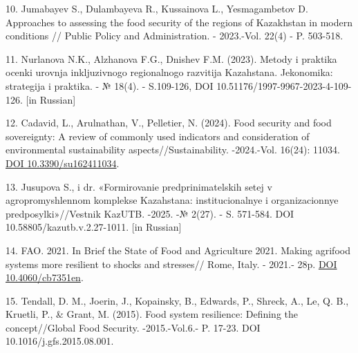 \begin{refs}
10. Jumabayev S., Dulambayeva R., Kussainova L., Yesmagambetov D.
Approaches to assessing the food security of the regions of Kazakhstan
in modern conditions // Public Policy and Administration. - 2023.-Vol.
22(4) - P. 503-518.

11. Nurlanova N.K., Al\textquotesingle zhanova F.G., Dnishev F.M.
(2023). Metody i praktika ocenki urovnja inkljuzivnogo
regional\textquotesingle nogo razvitija Kazahstana. Jekonomika:
strategija i praktika. - № 18(4). - S.109-126, DOI
10.51176/1997-9967-2023-4-109-126. {[}in Russian{]}

12. Cadavid, L., Arulnathan, V., Pelletier, N. (2024). Food security and
food sovereignty: A review of commonly used indicators and consideration
of environmental sustainability aspects//Sustainability. -2024.-Vol.
16(24): 11034. \href{https://doi.org/10.3390/su162411034}{DOI
10.3390/su162411034}.

13. Jusupova S., i dr. «Formirovanie predprinimatel\textquotesingle skih
setej v agropromyshlennom komplekse Kazahstana:
institucional\textquotesingle nye i organizacionnye
predposylki»//Vestnik KazUTB. -2025. -№ 2(27). - S. 571-584. DOI
10.58805/kazutb.v.2.27-1011. {[}in Russian{]}

14. FAO. 2021. In Brief the State of Food and Agriculture 2021. Making
agrifood systems more resilient to shocks and stresses// Rome, Italy. -
2021.- 28p. \href{https://doi.org/10.4060/cb7351en}{DOI
10.4060/cb7351en}.

15. Tendall, D. M., Joerin, J., Kopainsky, B., Edwards, P., Shreck, A.,
Le, Q. B., Kruetli, P., \& Grant, M. (2015). Food system resilience:
Defining the concept//Global Food Security. -2015.-Vol.6.- P. 17-23. DOI
10.1016/j.gfs.2015.08.001.
\end{refs}

